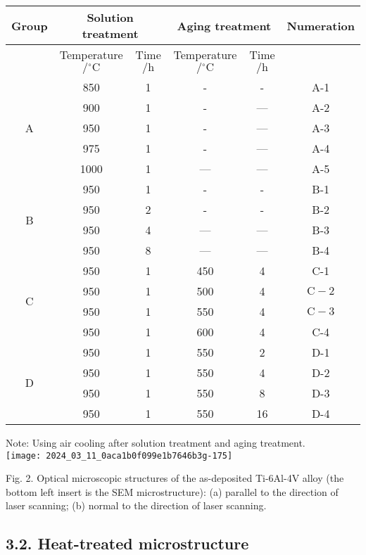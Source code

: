 \documentclass[10pt]{article}
\begin{document}
\begin{center}
\begin{tabular}{|c|c|c|c|c|c|}
\hline
\multirow{2}{*}{Group} & \multicolumn{2}{|c|}{Solution treatment} & \multicolumn{2}{|c|}{Aging treatment} & \multirow{2}{*}{Numeration} \\
\hline
 & Temperature $/{ }^{\circ} \mathrm{C}$ & Time $/ \mathrm{h}$ & Temperature $/{ }^{\circ} \mathrm{C}$ & Time $/ \mathrm{h}$ &  \\
\hline
\multirow{5}{*}{A} & 850 & 1 & - & - & A-1 \\
\hline
 & 900 & 1 & - & — & A-2 \\
\hline
 & 950 & 1 & - & — & A-3 \\
\hline
 & 975 & 1 & - & — & A-4 \\
\hline
 & 1000 & 1 & — & — & A-5 \\
\hline
\multirow{4}{*}{B} & 950 & 1 & - & - & B-1 \\
\hline
 & 950 & 2 & - & - & B-2 \\
\hline
 & 950 & 4 & — & — & B-3 \\
\hline
 & 950 & 8 & — & — & B-4 \\
\hline
\multirow{4}{*}{$\mathrm{C}$} & 950 & 1 & 450 & 4 & C-1 \\
\hline
 & 950 & 1 & 500 & 4 & $\mathrm{C}-2$ \\
\hline
 & 950 & 1 & 550 & 4 & $\mathrm{C}-3$ \\
\hline
 & 950 & 1 & 600 & 4 & C-4 \\
\hline
\multirow{4}{*}{$\mathrm{D}$} & 950 & 1 & 550 & 2 & D-1 \\
\hline
 & 950 & 1 & 550 & 4 & D-2 \\
\hline
 & 950 & 1 & 550 & 8 & D-3 \\
\hline
 & 950 & 1 & 550 & 16 & D-4 \\
\hline
\end{tabular}
\end{center}

Note: Using air cooling after solution treatment and aging treatment.\\
\texttt{[image: 2024\_03\_11\_0aca1b0f099e1b7646b3g-175]}

Fig. 2. Optical microscopic structures of the as-deposited Ti-6Al-4V alloy (the bottom left insert is the SEM microstructure): (a) parallel to the direction of laser scanning; (b) normal to the direction of laser scanning.

\subsection*{3.2. Heat-treated microstructure}
\end{document}
